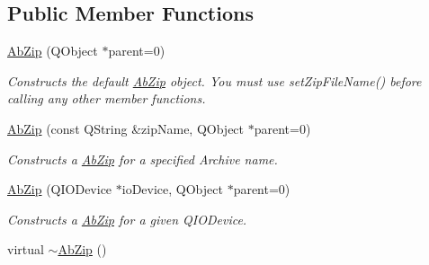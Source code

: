 \subsection*{Public Member Functions}
\begin{DoxyCompactItemize}
\item 
\hyperlink{class_ab_zip_a7ed92297b98cffe8e8962c4f8f4bb0f8}{Ab\+Zip} (Q\+Object $\ast$parent=0)\hypertarget{class_ab_zip_a7ed92297b98cffe8e8962c4f8f4bb0f8}{}\label{class_ab_zip_a7ed92297b98cffe8e8962c4f8f4bb0f8}

\begin{DoxyCompactList}\small\item\em Constructs the default \hyperlink{class_ab_zip}{Ab\+Zip} object. You must use set\+Zip\+File\+Name() before calling any other member functions. \end{DoxyCompactList}\item 
\hyperlink{class_ab_zip_a74a6d96f82ac0175654f008b2c70ab2a}{Ab\+Zip} (const Q\+String \&zip\+Name, Q\+Object $\ast$parent=0)\hypertarget{class_ab_zip_a74a6d96f82ac0175654f008b2c70ab2a}{}\label{class_ab_zip_a74a6d96f82ac0175654f008b2c70ab2a}

\begin{DoxyCompactList}\small\item\em Constructs a \hyperlink{class_ab_zip}{Ab\+Zip} for a specified Archive name. \end{DoxyCompactList}\item 
\hyperlink{class_ab_zip_a6bb8457120378a4b46f9f9919608a0d3}{Ab\+Zip} (Q\+I\+O\+Device $\ast$io\+Device, Q\+Object $\ast$parent=0)\hypertarget{class_ab_zip_a6bb8457120378a4b46f9f9919608a0d3}{}\label{class_ab_zip_a6bb8457120378a4b46f9f9919608a0d3}

\begin{DoxyCompactList}\small\item\em Constructs a \hyperlink{class_ab_zip}{Ab\+Zip} for a given Q\+I\+O\+Device. \end{DoxyCompactList}\item 
virtual \hyperlink{class_ab_zip_a46bccdabd74355e149241d96b1494085}{$\sim$\+Ab\+Zip} ()\hypertarget{class_ab_zip_a46bccdabd74355e149241d96b1494085}{}\label{class_ab_zip_a46bccdabd74355e149241d96b1494085}


\end{DoxyCompactItemize}
